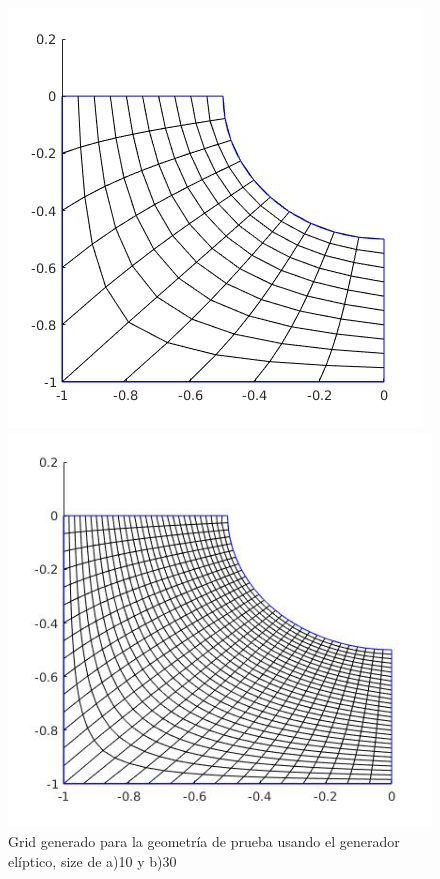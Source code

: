 \documentclass[11pt,letterpaper]{article}
\begin{document}
\begin{figure}[H]
	\begin{minipage}{.49\linewidth}
		\centering
		\includegraphics[scale=0.41]{./imgs/img_elliptic_generator_size_10.jpg}
	\end{minipage}
	\begin{minipage}{.49\linewidth}
		\centering
		\includegraphics[scale=0.41]{./imgs/img_elliptic_generator_size_30.jpg}
	\end{minipage}
	\caption{Grid generado para la geometr\'ia de prueba usando el generador el\'iptico, size de a)10 y b)30}
			\label{fig:img_grid_elliptic}
\end{figure}
	
\end{document}
